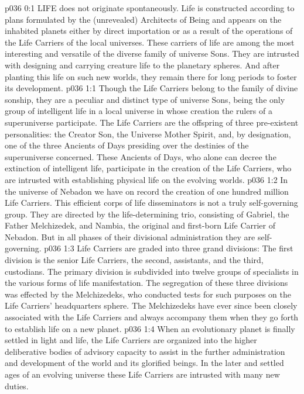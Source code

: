 \vs p036 0:1 LIFE does not originate spontaneously. Life is constructed according to plans formulated by the (unrevealed) Architects of Being and appears on the inhabited planets either by direct importation or as a result of the operations of the Life Carriers of the local universes. These carriers of life are among the most interesting and versatile of the diverse family of universe Sons. They are intrusted with designing and carrying creature life to the planetary spheres. And after planting this life on such new worlds, they remain there for long periods to foster its development.
\vs p036 1:1 Though the Life Carriers belong to the family of divine sonship, they are a peculiar and distinct type of universe Sons, being the only group of intelligent life in a local universe in whose creation the rulers of a superuniverse participate. The Life Carriers are the offspring of three pre\hyp{}existent personalities: the Creator Son, the Universe Mother Spirit, and, by designation, one of the three Ancients of Days presiding over the destinies of the superuniverse concerned. These Ancients of Days, who alone can decree the extinction of intelligent life, participate in the creation of the Life Carriers, who are intrusted with establishing physical life on the evolving worlds.
\vs p036 1:2 In the universe of Nebadon we have on record the creation of one hundred million Life Carriers. This efficient corps of life disseminators is not a truly self\hyp{}governing group. They are directed by the life\hyp{}determining trio, consisting of Gabriel, the Father Melchizedek, and Nambia, the original and first\hyp{}born Life Carrier of Nebadon. But in all phases of their divisional administration they are self\hyp{}governing.
\vs p036 1:3 Life Carriers are graded into three grand divisions: The first division is the senior Life Carriers, the second, assistants, and the third, custodians. The primary division is subdivided into twelve groups of specialists in the various forms of life manifestation. The segregation of these three divisions was effected by the Melchizedeks, who conducted tests for such purposes on the Life Carriers’ headquarters sphere. The Melchizedeks have ever since been closely associated with the Life Carriers and always accompany them when they go forth to establish life on a new planet.
\vs p036 1:4 When an evolutionary planet is finally settled in light and life, the Life Carriers are organized into the higher deliberative bodies of advisory capacity to assist in the further administration and development of the world and its glorified beings. In the later and settled ages of an evolving universe these Life Carriers are intrusted with many new duties.
